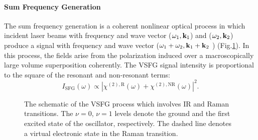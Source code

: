 \paragraph{Sum Frequency Generation}
The sum frequency generation is a coherent nonlinear optical process in which incident laser beams with frequency and wave vector 
($\omega_1, {\bf k}_1$) and ($\omega_2, {\bf k}_2$) produce a signal with frequency and wave vector
($\omega_1+\omega_2, {\bf k}_1+{\bf k}_2$ ) (Fig.\thinspace\ref{fig:sfg_1a}). 
In this process, the  fields arise from the polarization induced over a macroscopically large volume superposition coherently.
%
The VSFG signal intensity is proportional to the square of the resonant and non-resonant terms:
\begin{equation}
  I_{\text{SFG}}(\omega) \varpropto |\chi^{(2),\text{R}}(\omega)+\chi^{(2),\text{NR}}(\omega)|^2.
\label{eq:I_SFG}
\end{equation}
\begin{figure}[h]
\centering
{}
\caption{The schematic of the VSFG process which involves IR and Raman transitions. The $\nu =0$, $\nu=1$ levels denote the ground and the first excited state of the oscillator, respectively.
 The dashed line denotes a virtual electronic state in the Raman transition.}\label{fig:sfg_1a} 
\end{figure}

